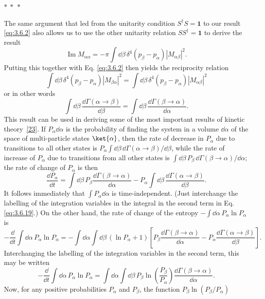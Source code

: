\begin{center}
$*\ *\ *$
\end{center}

The same argument that led from the unitarity condition $S^\dagger S=\mathbf{1}$ to our result
\eqref{eq:3.6.2} also allows us to use the other unitarity relation $SS^\dagger=\mathbf{1}$ to derive the
result
\begin{equation}
 \operatorname{Im}M_{\alpha\alpha}
 =-\pi\int \dd\beta\,\delta^4(p_\beta-p_\alpha)|M_{\alpha\beta}|^2.
 \tag{3.6.16}\label{eq:3.6.16}
\end{equation}
Putting this together with Eq. \eqref{eq:3.6.2} then yields the reciprocity relation
\begin{equation}
 \int \dd\beta\,\delta^4(p_\beta-p_\alpha)|M_{\beta\alpha}|^2
 =\int \dd\beta\,\delta^4(p_\beta-p_\alpha)|M_{\alpha\beta}|^2
 \tag{3.6.17}\label{eq:3.6.17}
\end{equation}
or in other words
\begin{equation}
 \int \dd\beta\,\frac{\dd\Gamma(\alpha\to\beta)}{\dd\beta}
 =\int \dd\beta\,\frac{\dd\Gamma(\beta\to\alpha)}{\dd\alpha}.
 \tag{3.6.18}\label{eq:3.6.18}
\end{equation}
This result can be used in deriving some of the most important results of kinetic theory~\hyperref[ref:3.23]{[23]}.
If $P_\alpha \dd\alpha$ is the probability of finding the system in a volume $\dd\alpha$ of the space
of multi-particle states $\ket{\alpha}$, then the rate of decrease in $P_\alpha$ due to transitions
to all other states is $P_\alpha\int \dd\beta\,\dd\Gamma(\alpha\to\beta)/\dd\beta$, while the rate of
increase of $P_\alpha$ due to transitions from all other states is
$\int \dd\beta\,P_\beta\,\dd\Gamma(\beta\to\alpha)/\dd\alpha$; the rate of change of $P_\alpha$ is then
\begin{equation}
 \frac{\dd P_\alpha}{\dd t}=\int \dd\beta\,P_\beta\frac{\dd\Gamma(\beta\to\alpha)}{\dd\alpha}
 -P_\alpha\int \dd\beta\,\frac{\dd\Gamma(\alpha\to\beta)}{\dd\beta}.
 \tag{3.6.19}\label{eq:3.6.19}
\end{equation}
It follows immediately that $\int P_\alpha \dd\alpha$ is time-independent. (Just interchange the
labelling of the integration variables in the integral in the second term in Eq. \eqref{eq:3.6.19}.)
On the other hand, the rate of change of the entropy $-\int \dd\alpha\,P_\alpha\ln P_\alpha$ is
\[
 -\frac{\dd}{\dd t}\int \dd\alpha\,P_\alpha\ln P_\alpha
 =-\int \dd\alpha\int \dd\beta\,(\ln P_\alpha+1)
 \left[P_\beta\frac{\dd\Gamma(\beta\to\alpha)}{\dd\alpha}
 -P_\alpha\frac{\dd\Gamma(\alpha\to\beta)}{\dd\beta}\right].
\]
Interchanging the labelling of the integration variables in the second term, this may be written
\[
 -\frac{\dd}{\dd t}\int \dd\alpha\,P_\alpha\ln P_\alpha
 =\int \dd\alpha\int \dd\beta\,P_\beta\ln\left(\frac{P_\beta}{P_\alpha}\right)
 \frac{\dd\Gamma(\beta\to\alpha)}{\dd\alpha}.
\]
Now, for any positive probabilities $P_\alpha$ and $P_\beta$, the function
$P_\beta\ln(P_\beta/P_\alpha)$
